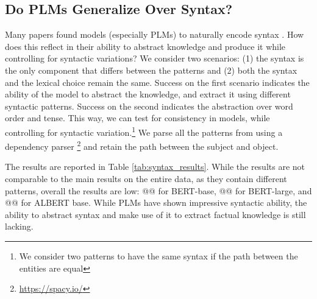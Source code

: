 


% 




\subsection{Do PLMs Generalize Over Syntax?} 



Many papers found models (especially PLMs) to naturally encode syntax \cite{linzen2016assessing,marvin-linzen-2018-targeted,yoav-syntax,hewitt2019structural}. How does this reflect in their ability to abstract knowledge and produce it while controlling for syntactic variations?
We consider two scenarios: (1) the syntax is the only component that differs between the patterns and (2) both the syntax and the lexical choice remain the same.
Success on the first scenario indicates the ability of the model to abstract the knowledge, and extract it using different syntactic patterns. Success on the second indicates the abstraction over word order and tense. This way, we can test for consistency in models, while controlling for syntactic variation.\footnote{We consider two patterns to have the same syntax if the path between the entities are equal} 
We parse all the patterns from \resource{} using a dependency parser \cite{spacy}\footnote{\url{https://spacy.io/}} and retain the path between the subject and object.


The results are reported in Table \ref{tab:syntax_results}.  While the results are not comparable to the main results on the entire data, as they contain different patterns, overall the results are low: @@ for BERT-base, @@ for BERT-large, and @@ for ALBERT base. 
While PLMs have shown impressive syntactic ability, the ability to abstract syntax and make use of it to extract factual knowledge is still lacking.

